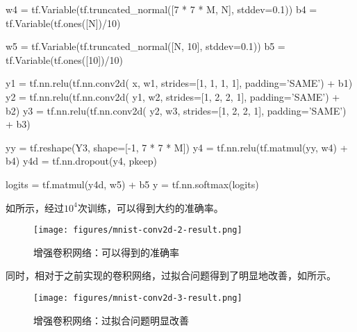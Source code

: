 \begin{content}
\begin{leftbar}
\begin{python}
w4 = tf.Variable(tf.truncated_normal([7 * 7 * M, N], stddev=0.1))
b4 = tf.Variable(tf.ones([N])/10)

w5 = tf.Variable(tf.truncated_normal([N, 10], stddev=0.1))
b5 = tf.Variable(tf.ones([10])/10)

y1 = tf.nn.relu(tf.nn.conv2d(
       x,  w1, strides=[1, 1, 1, 1], padding='SAME') + b1)
y2 = tf.nn.relu(tf.nn.conv2d(
       y1, w2, strides=[1, 2, 2, 1], padding='SAME') + b2)
y3 = tf.nn.relu(tf.nn.conv2d(
       y2, w3, strides=[1, 2, 2, 1], padding='SAME') + b3)

yy = tf.reshape(Y3, shape=[-1, 7 * 7 * M])
y4 = tf.nn.relu(tf.matmul(yy, w4) + b4)
y4d = tf.nn.dropout(y4, pkeep)

logits = tf.matmul(y4d, w5) + b5
y = tf.nn.softmax(logits)
\end{python}
\end{leftbar}

如所示，经过$10^4$次训练，可以得到大约的准确率。

\begin{figure}[H]
\centering
\texttt{[image: figures/mnist-conv2d-2-result.png]}
\caption{增强卷积网络：可以得到的准确率}
 \label{fig:mnist-conv2d-2-result}
\end{figure}

同时，相对于之前实现的卷积网络，过拟合问题得到了明显地改善，如所示。

\begin{figure}[H]
\centering
\texttt{[image: figures/mnist-conv2d-3-result.png]}
\caption{增强卷积网络：过拟合问题明显改善}
 \label{fig:mnist-conv2d-3-result}
\end{figure}

\end{content}
